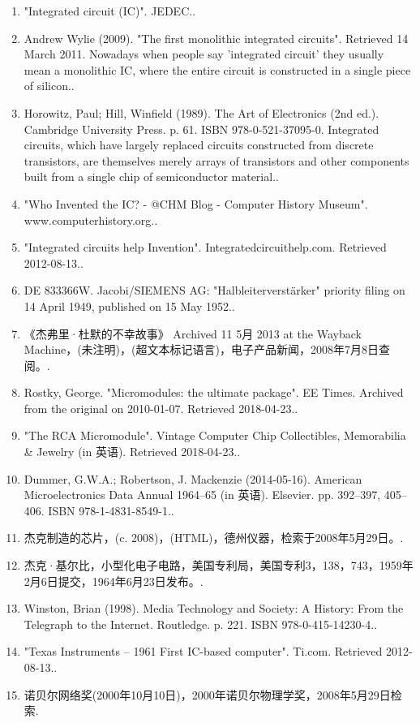 \begin{enumerate}
\item "Integrated circuit (IC)". JEDEC..
\item Andrew Wylie (2009). "The first monolithic integrated circuits". Retrieved 14 March 2011. Nowadays when people say 'integrated circuit' they usually mean a monolithic IC, where the entire circuit is constructed in a single piece of silicon..
\item Horowitz, Paul; Hill, Winfield (1989). The Art of Electronics (2nd ed.). Cambridge University Press. p. 61. ISBN 978-0-521-37095-0. Integrated circuits, which have largely replaced circuits constructed from discrete transistors, are themselves merely arrays of transistors and other components built from a single chip of semiconductor material..
\item "Who Invented the IC? - @CHM Blog - Computer History Museum". www.computerhistory.org..
\item "Integrated circuits help Invention". Integratedcircuithelp.com. Retrieved 2012-08-13..
\item DE 833366W. Jacobi/SIEMENS AG: "Halbleiterverstärker" priority filing on 14 April 1949, published on 15 May 1952..
\item 《杰弗里·杜默的不幸故事》 Archived 11 5月 2013 at the Wayback Machine，(未注明)，(超文本标记语言)，电子产品新闻，2008年7月8日查阅。.
\item Rostky, George. "Micromodules: the ultimate package". EE Times. Archived from the original on 2010-01-07. Retrieved 2018-04-23..
\item "The RCA Micromodule". Vintage Computer Chip Collectibles, Memorabilia & Jewelry (in 英语). Retrieved 2018-04-23..
\item Dummer, G.W.A.; Robertson, J. Mackenzie (2014-05-16). American Microelectronics Data Annual 1964–65 (in 英语). Elsevier. pp. 392–397, 405–406. ISBN 978-1-4831-8549-1..
\item 杰克制造的芯片，(c. 2008)，(HTML)，德州仪器，检索于2008年5月29日。.
\item 杰克·基尔比，小型化电子电路，美国专利局，美国专利3，138，743，1959年2月6日提交，1964年6月23日发布。.
\item Winston, Brian (1998). Media Technology and Society: A History: From the Telegraph to the Internet. Routledge. p. 221. ISBN 978-0-415-14230-4..
\item "Texas Instruments – 1961 First IC-based computer". Ti.com. Retrieved 2012-08-13..
\item 诺贝尔网络奖(2000年10月10日)，2000年诺贝尔物理学奖，2008年5月29日检索.

\end{enumerate}
